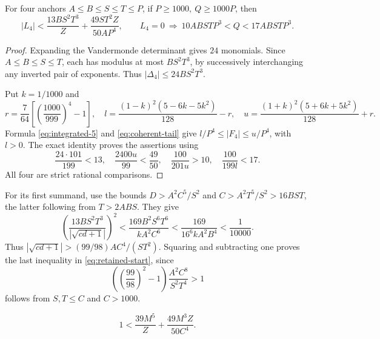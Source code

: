 
\begin{lemma}\label{lem:direct-four}
For four anchors \(A\le B\le S\le T\le P\), if
\(P\ge1000,\ Q\ge1000P\), then
\[
 |L_4|<\frac{13BS^2T^3}{Z}+\frac{49ST^2Z}{50AP^4},\qquad
 L_4=0\ \Longrightarrow\ 10ABSTP^3<Q<17ABSTP^3.
\]
\end{lemma}
\begin{proof}
Expanding the Vandermonde determinant gives \(24\) monomials.
Since \(A\le B\le S\le T\), each has modulus at most
\(BS^2T^3\), by successively interchanging any inverted pair of
exponents. Thus \(|\Delta_4|\le24BS^2T^3\).

Put \(k=1/1000\) and
\[
 r=\frac7{64}\left[\left(\frac{1000}{999}\right)^4-1\right],\quad
 l=\frac{(1-k)^2(5-6k-5k^2)}{128}-r,\quad
 u=\frac{(1+k)^2(5+6k+5k^2)}{128}+r.
\]
Formula \eqref{eq:integrated-5} and \eqref{eq:coherent-tail} give
\(l/P^4\le|F_4|\le u/P^4\), with \(l>0\).
The exact identity proves the assertions using
\[
 \frac{24\cdot101}{199}<13,\quad
 \frac{2400u}{99}<\frac{49}{50},\quad
 \frac{100}{201u}>10,\quad \frac{100}{199l}<17.
\]
All four are strict rational comparisons.
\end{proof}

For its first summand, use the bounds \(D>A^2C^5/S^2\) and
\(C>A^2T^5/S^2>16BST\), the latter following from \(T>2ABS\).
They give
\[
 \left(\frac{13BS^2T^3}{|\sqrt{cd+1}|}\right)^2
 <\frac{169B^2S^6T^6}{kA^2C^6}
 <\frac{169}{16^6kA^2B^4}<\frac1{10000}.
\]
Thus \(|\sqrt{cd+1}|>(99/98)AC^4/(ST^2)\).
Squaring and subtracting one proves the last inequality in
\eqref{eq:retained-start}, since
\[
 \left(\left(\frac{99}{98}\right)^2-1\right)
       \frac{A^2C^8}{S^2T^4}>1
\]
follows from \(S,T\le C\) and \(C>1000\).

\[
 1<\frac{39M^5}{Z}+\frac{49M^3Z}{50C^4}.
\]
